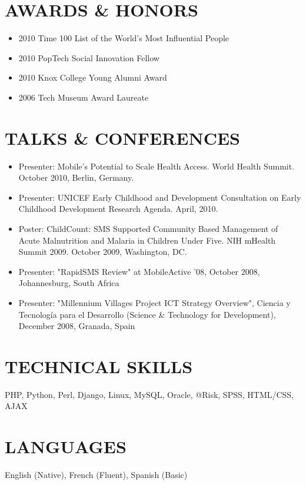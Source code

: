 \documentclass{res}
\begin{document}
\begin{resume}
\section{AWARDS \& HONORS}
\begin{itemize} \itemsep -2pt
	\item 2010 Time 100 List of the World's Most Influential People
	\item 2010 PopTech Social Innovation Fellow
    \item 2010 Knox College Young Alumni Award
	\item 2006 Tech Museum Award Laureate
\end{itemize}

\section{TALKS \& CONFERENCES}
\begin{itemize} \itemsep -2pt
	\item Presenter: Mobile's Potential to Scale Health Access. World Health Summit.  October 2010, Berlin, Germany.
	\item Presenter: UNICEF Early Childhood and Development Consultation on Early Childhood Development Research Agenda. April, 2010.
	\item Poster: ChildCount: SMS Supported Community Based Management of Acute Malnutrition and Malaria in Children Under Five.  NIH mHealth Summit	2009.  October 2009, Washington, DC.
	\item Presenter: "RapidSMS Review" at MobileActive '08, October 2008, Johannesburg, South Africa
	\item Presenter: "Millennium Villages Project ICT Strategy Overview", Ciencia y Tecnología para el Desarrollo (Science \& Technology for Development), December 2008, Granada, Spain
\end{itemize}

\section{TECHNICAL SKILLS}
\vspace{8pt} 
PHP, Python, Perl, Django, Linux, MySQL, Oracle, @Risk, SPSS, HTML/CSS, AJAX

\section{LANGUAGES} 
\vspace{8pt}
English (Native), French (Fluent), Spanish (Basic)


\end{resume}
\end{document}
